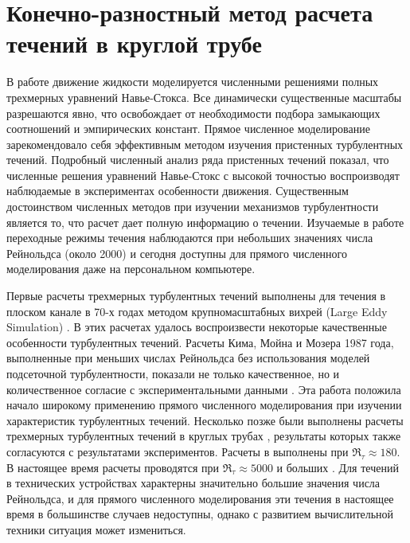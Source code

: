 
\chapter{Конечно-разностный метод расчета течений в круглой трубе}

В работе движение жидкости моделируется численными решениями полных трехмерных уравнений Навье-Стокса. Все динамически существенные масштабы разрешаются явно, что освобождает от необходимости подбора замыкающих соотношений и эмпирических констант. Прямое численное моделирование зарекомендовало себя эффективным методом изучения пристенных турбулентных течений. Подробный численный анализ ряда пристенных течений показал, что численные решения уравнений Навье-Стокс с высокой точностью воспроизводят наблюдаемые в экспериментах особенности движения. Существенным достоинством численных методов при изучении механизмов турбулентности является то, что расчет дает полную информацию о течении. Изучаемые в работе переходные режимы течения наблюдаются при небольших значениях числа Рейнольдса (около 2000) и сегодня доступны для прямого численного моделирования даже на персональном компьютере. 

Первые расчеты трехмерных турбулентных течений выполнены для течения в плоском канале в 70-х годах методом крупномасштабных вихрей (Large Eddy Simulation) \cite{Deardorff1970, Schumann1975, Moin1978, Moin1982}. В этих расчетах удалось воспроизвести некоторые качественные особенности турбулентных течений. Расчеты Кима, Мойна и Мозера 1987 года, выполненные при меньших числах Рейнольдса без использования моделей подсеточной турбулентности, показали не только качественное, но и количественное согласие с экспериментальными данными \cite{Kim1987}. Эта работа положила начало широкому применению прямого численного моделирования при изучении характеристик турбулентных течений. Несколько позже были выполнены расчеты трехмерных турбулентных течений в круглых трубах \cite{Pri1987, Pri1991, Nikitin1994b, Nikitin1996}, результаты которых также согласуются с результатами экспериментов. Расчеты в \cite{Kim1987} выполнены при $\Re_\tau \approx 180$. В настоящее время расчеты проводятся при $\Re_\tau \approx 5000$ и больших \cite{Ahn2015, Lee2015}. Для течений в технических устройствах характерны значительно большие значения числа Рейнольдса, и для прямого численного моделирования эти течения в настоящее время в большинстве случаев недоступны, однако с развитием вычислительной техники ситуация может измениться. 

